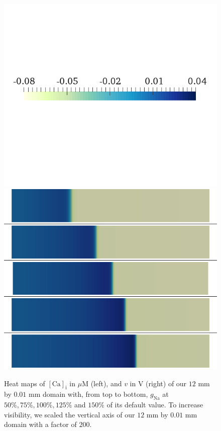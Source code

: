 \documentclass{article}
\begin{document}
\begin{figure}
\begin{minipage}{0.5\textwidth}
\includegraphics[trim=0cm 7cm 0cm 6cm, clip=true, width=1\linewidth]{legend_v2}
\includegraphics[trim=0cm 0cm 0cm 0cm, clip=true, width=1\linewidth]{v_gna}
    \end{minipage}
    \caption{Heat maps of $[\mathrm{Ca}]_{\mathrm{i}}$ in $\mu$M (left), and $v$ in V (right) of our $12$ mm by $0.01$ mm domain with, from top to bottom, $g_{\mathrm{Na}}$ at $50\%, 75\%, 100\%, 125\%$ and $150\%$ of its default value. To increase visibility, we scaled the vertical axis of our $12$ mm by $0.01$ mm domain with a factor of $200$.}
    \label{fig:1a}
\end{figure}
\end{document}
